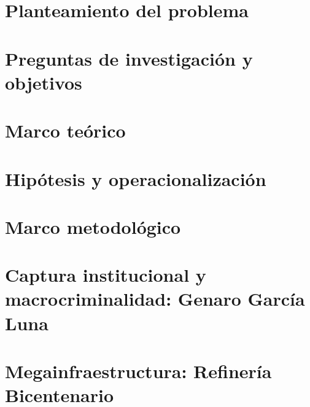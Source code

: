 \documentclass[12pt,letterpaper,oneside,openany]{book}
\begin{document}


\clearpage

\chapter{Planteamiento del problema}



\clearpage

\chapter{Preguntas de investigación y objetivos}



\clearpage

\chapter{Marco teórico}



\clearpage

\chapter{Hipótesis y operacionalización}



\clearpage

\chapter{Marco metodológico}



\clearpage

\chapter{Captura institucional y macrocriminalidad: Genaro García Luna}



\clearpage

\chapter{Megainfraestructura: Refinería Bicentenario}
\end{document}
